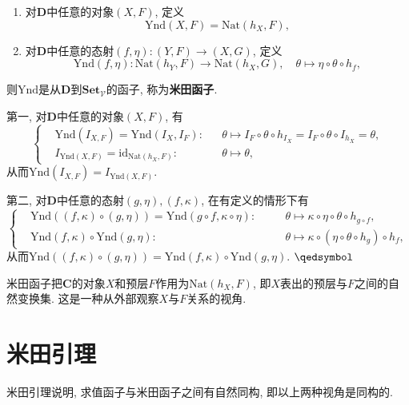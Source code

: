 \documentclass[UTF8]{ctexart}
\begin{document}
\begin{enumerate}
    \item 对$\mathbf{D}$中任意的对象$(X,F)$, 定义
    \[
        \mathrm{Ynd}(X,F)=\mathrm{Nat}(h_X,F),
    \]
    \item 对$\mathbf{D}$中任意的态射$(f,\eta):(Y,F)\to(X,G)$, 定义
    \[
        \mathrm{Ynd}(f,\eta):\mathrm{Nat}(h_Y,F)\to\mathrm{Nat}(h_X,G),
        \quad\theta\mapsto\eta\circ\theta\circ h_f,
    \]
\end{enumerate}
则$\mathrm{Ynd}$是从$\mathbf{D}$到$\mathbf{Set}_{\mathcal{V}}$的函子,
称为\textbf{米田函子}.


第一, 对$\mathbf{D}$中任意的对象$(X,F)$, 有
\[\left\{\begin{aligned}
    &\mathrm{Ynd}(I_{X,F})=\mathrm{Ynd}(I_X,I_F):&&\theta\mapsto
    I_F\circ\theta\circ h_{I_X}=I_F\circ\theta\circ I_{h_X}=\theta,\\[-3pt]
    &I_{\mathrm{Ynd}(X,F)}=\mathrm{id}_{\mathrm{Nat}(h_X,F)}:
    &&\theta\mapsto\theta,
\end{aligned}\right.\]
从而$\mathrm{Ynd}(I_{X,F})=I_{\mathrm{Ynd}(X,F)}$.

第二, 对$\mathbf{D}$中任意的态射$(g,\eta),(f,\kappa)$, 在有定义的情形下有
\[\left\{\begin{aligned}
    &\mathrm{Ynd}((f,\kappa)\circ(g,\eta))=\mathrm{Ynd}(g\circ f,\kappa\circ\eta):
    \quad&&\theta\mapsto\kappa\circ\eta\circ\theta\circ h_{g\circ f},\\[-3pt]
    &\mathrm{Ynd}(f,\kappa)\circ\mathrm{Ynd}(g,\eta):\quad&&\theta\mapsto
    \kappa\circ(\eta\circ\theta\circ h_g)\circ h_f,
\end{aligned}\right.\]
从而$\mathrm{Ynd}((f,\kappa)\circ(g,\eta))=\mathrm{Ynd}(f,\kappa)\circ
\mathrm{Ynd}(g,\eta)$. \hfill $\qedsymbol$

\vspace{10pt}

米田函子把$\mathbf{C}$的对象$X$和预层$F$作用为$\mathrm{Nat}(h_X,F)$,
即$X$表出的预层与$F$之间的自然变换集. 这是一种从外部观察$X$与$F$关系的视角.






\newpage

\section{米田引理}

米田引理说明, 求值函子与米田函子之间有自然同构, 即以上两种视角是同构的.
\end{document}
